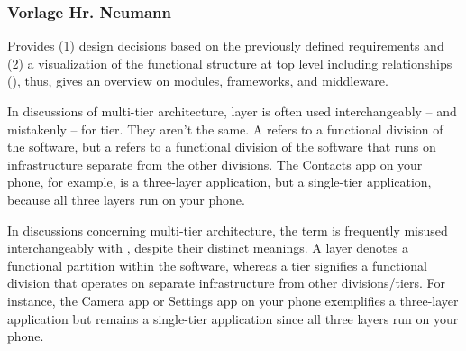 \documentclass[conference,a4paper]{cs-techrep}
\begin{document}
\subsubsection{Vorlage Hr. Neumann}
Provides
(1) design decisions based on the previously defined requirements and
(2) a visualization of the functional structure at top level including relationships (), thus, gives an overview on modules, frameworks, and middleware.

In discussions of multi-tier architecture, layer is often used interchangeably -- and mistakenly -- for tier. They aren't the same. A  refers to a functional division of the software, but a  refers to a functional division of the software that runs on infrastructure separate from the other divisions. The Contacts app on your phone, for example, is a three-layer application, but a single-tier application, because all three layers run on your phone.

In discussions concerning multi-tier architecture, the term  is frequently misused interchangeably with , despite their distinct meanings. A layer denotes a functional partition within the software, whereas a tier signifies a functional division that operates on separate infrastructure from other divisions/tiers. For instance, the Camera app or Settings app on your phone exemplifies a three-layer application but remains a single-tier application since all three layers run on your phone.
\end{document}

